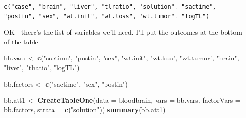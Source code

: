 \documentclass[]{book}
\newenvironment{Shaded}{\begin{snugshade}}{\end{snugshade}}
\newcommand{\KeywordTok}[1]{\textcolor[rgb]{0.13,0.29,0.53}{\textbf{#1}}}
\newcommand{\DataTypeTok}[1]{\textcolor[rgb]{0.13,0.29,0.53}{#1}}
\newcommand{\StringTok}[1]{\textcolor[rgb]{0.31,0.60,0.02}{#1}}
\newcommand{\NormalTok}[1]{#1}
\theoremstyle{definition}
\theoremstyle{definition}
\theoremstyle{definition}
\theoremstyle{remark}
\begin{document}
\begin{verbatim}
c("case", "brain", "liver", "tlratio", "solution", "sactime", 
"postin", "sex", "wt.init", "wt.loss", "wt.tumor", "logTL")
\end{verbatim}

OK - there's the list of variables we'll need. I'll put the outcomes at
the bottom of the table.

\begin{Shaded}
\begin{Highlighting}[]
\NormalTok{bb.vars <-}\StringTok{ }\KeywordTok{c}\NormalTok{(}\StringTok{"sactime"}\NormalTok{, }\StringTok{"postin"}\NormalTok{, }\StringTok{"sex"}\NormalTok{, }\StringTok{"wt.init"}\NormalTok{, }\StringTok{"wt.loss"}\NormalTok{, }
             \StringTok{"wt.tumor"}\NormalTok{, }\StringTok{"brain"}\NormalTok{, }\StringTok{"liver"}\NormalTok{, }\StringTok{"tlratio"}\NormalTok{, }\StringTok{"logTL"}\NormalTok{)}

\NormalTok{bb.factors <-}\StringTok{ }\KeywordTok{c}\NormalTok{(}\StringTok{"sactime"}\NormalTok{, }\StringTok{"sex"}\NormalTok{, }\StringTok{"postin"}\NormalTok{)}

\NormalTok{bb.att1 <-}\StringTok{ }\KeywordTok{CreateTableOne}\NormalTok{(}\DataTypeTok{data =}\NormalTok{ bloodbrain,}
                          \DataTypeTok{vars =}\NormalTok{ bb.vars,}
                          \DataTypeTok{factorVars =}\NormalTok{ bb.factors,}
                          \DataTypeTok{strata =} \KeywordTok{c}\NormalTok{(}\StringTok{"solution"}\NormalTok{))}
\KeywordTok{summary}\NormalTok{(bb.att1)}
\end{Highlighting}
\end{Shaded}
\end{document}
